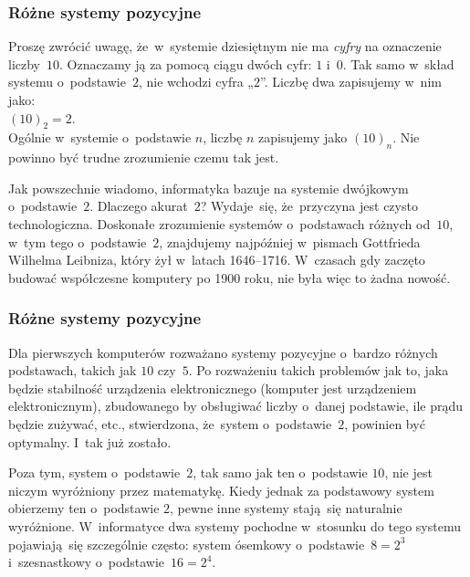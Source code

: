 \documentclass[10pt,t]{beamer}
\begin{document}
\begin{frame}
  \frametitle{Różne systemy pozycyjne}


  Proszę zwrócić uwagę, że~w~systemie dziesiętnym nie ma \textit{cyfry}
  na oznaczenie liczby~$10$. Oznaczamy ją za pomocą ciągu dwóch cyfr: $1$
  i~$0$. Tak samo w~skład systemu o~podstawie~$2$, nie wchodzi cyfra „$2$”.
  Liczbę dwa zapisujemy w~nim jako: \\
  $(10)_{ 2 } = 2.$ \\
  Ogólnie w~systemie o~podstawie $n$, liczbę $n$ zapisujemy jako
  $(10)_{ n }$. Nie powinno być trudne zrozumienie czemu tak jest.

  Jak powszechnie wiadomo, informatyka bazuje na systemie dwójkowym
  o~podstawie~$2$. Dlaczego akurat~$2$? Wydaje~się, że~przyczyna jest
  czysto technologiczna. Doskonałe zrozumienie systemów o~podstawach
  różnych od~$10$, w~tym tego o~podstawie~$2$, znajdujemy najpóźniej
  w~pismach Gottfrieda Wilhelma Leibniza, który żył w~latach 1646--1716.
  W~czasach gdy zaczęto budować współczesne komputery po 1900 roku, nie
  była więc to żadna nowość.

\end{frame}





\begin{frame}
  \frametitle{Różne systemy pozycyjne}


  Dla pierwszych komputerów rozważano systemy pozycyjne o~bardzo różnych
  podstawach, takich jak $10$ czy~$5$. Po rozważeniu takich problemów jak
  to, jaka będzie stabilność urządzenia elektronicznego (komputer
  \alert{jest} urządzeniem elektronicznym), zbudowanego by obsługiwać
  liczby o~danej podstawie, ile prądu będzie zużywać, etc., stwierdzona,
  że~system o~podstawie~$2$, powinien być optymalny. I~tak już zostało.

  Poza tym, system o~podstawie~$2$, tak samo jak ten o~podstawie $10$, nie
  jest niczym wyróżniony przez matematykę. Kiedy jednak za podstawowy
  system obierzemy ten o~podstawie $2$, pewne inne systemy stają~się
  naturalnie wyróżnione. W~informatyce dwa systemy pochodne w~stosunku do
  tego systemu pojawiają~się szczególnie często: system ósemkowy
  o~podstawie~$8 = 2^{ 3 }$ i~szesnastkowy o~podstawie~$16 = 2^{ 4 }$.

\end{frame}
\end{document}

